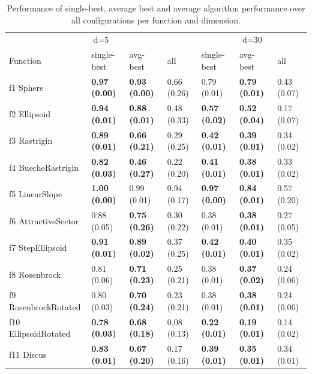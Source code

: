 \begin{table}
\caption{Performance of single-best, average best and average algorithm performance over all configurations per function and dimension.}
\begin{tabular}{lllllll}
\toprule
\multicolumn{4}{c}{d=5} & \multicolumn{3}{c}{d=30} \\
Function & single-best & avg-best & all & single-best & avg-best & all \\
\midrule
f1 Sphere & \textbf{0.97 (0.00)} & \textbf{0.93 (0.00)} & 0.66 (0.26) & 0.79 (0.01) & \textbf{0.79 (0.01)} & 0.43 (0.07) \\
f2 Ellipsoid & \textbf{0.94 (0.01)} & \textbf{0.88 (0.01)} & 0.48 (0.33) & \textbf{0.57 (0.02)} & \textbf{0.52 (0.04)} & 0.17 (0.07) \\
f3 Rastrigin & \textbf{0.89 (0.01)} & \textbf{0.66 (0.21)} & 0.29 (0.25) & \textbf{0.42 (0.01)} & \textbf{0.39 (0.01)} & 0.34 (0.02) \\
f4 BuecheRastrigin & \textbf{0.82 (0.03)} & \textbf{0.46 (0.27)} & 0.22 (0.20) & \textbf{0.41 (0.01)} & \textbf{0.38 (0.01)} & 0.33 (0.02) \\
f5 LinearSlope & \textbf{1.00 (0.00)} & 0.99 (0.01) & 0.94 (0.17) & \textbf{0.97 (0.00)} & \textbf{0.84 (0.01)} & 0.57 (0.20) \\
f6 AttractiveSector & 0.88 (0.05) & \textbf{0.75 (0.26)} & 0.30 (0.22) & 0.38 (0.01) & \textbf{0.38 (0.01)} & 0.27 (0.05) \\
f7 StepEllipsoid & \textbf{0.91 (0.01)} & \textbf{0.89 (0.02)} & 0.37 (0.25) & \textbf{0.42 (0.01)} & \textbf{0.40 (0.01)} & 0.35 (0.02) \\
f8 Rosenbrock & 0.81 (0.06) & \textbf{0.71 (0.23)} & 0.25 (0.21) & 0.38 (0.01) & \textbf{0.37 (0.02)} & 0.24 (0.06) \\
f9 RosenbrockRotated & 0.80 (0.03) & \textbf{0.70 (0.24)} & 0.23 (0.21) & 0.38 (0.01) & \textbf{0.38 (0.01)} & 0.24 (0.06) \\
f10 EllipsoidRotated & \textbf{0.78 (0.03)} & \textbf{0.68 (0.18)} & 0.08 (0.13) & \textbf{0.22 (0.01)} & \textbf{0.19 (0.01)} & 0.14 (0.02) \\
f11 Discus & \textbf{0.83 (0.01)} & \textbf{0.67 (0.20)} & 0.17 (0.16) & \textbf{0.39 (0.01)} & \textbf{0.35 (0.01)} & 0.34 (0.01) \\

\end{tabular}
\end{table}
